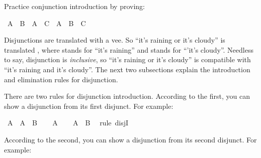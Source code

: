 \begin{isabellebody}
%
\begin{isamarkuptext}%
\begin{Exercise} Practice conjunction introduction by proving: \end{Exercise}%
\end{isamarkuptext}\isamarkuptrue%
\isamarkupfalse%
\ {\isachardoublequoteopen}{\isacharparenleft}A\ {\isasymlongrightarrow}\ B{\isacharparenright}\ {\isasymlongrightarrow}\ {\isacharparenleft}A\ {\isasymlongrightarrow}\ C{\isacharparenright}\ {\isasymlongrightarrow}\ A\ {\isasymlongrightarrow}\ B\ {\isasymand}\ C{\isachardoublequoteclose}%
\isadelimproof
\ %
\endisadelimproof
%
\isatagproof
{}\isamarkupfalse%
%
\endisatagproof
{\isafoldproof}%
%
\isadelimproof
%
\endisadelimproof
%
\isamarkuptrue%
%
\begin{isamarkuptext}%
Disjunctions are translated with a vee. So ``it's raining or it's cloudy'' is translated
, where  stands for ``it's raining'' and  stands for ``'it's cloudy''.
Needless to say, disjunction is \emph{inclusive}, so ``it's raining or it's cloudy'' is compatible with
``it's raining and it's cloudy''. The next two subsections explain the introduction and elimination
rules for disjunction.%
\end{isamarkuptext}\isamarkuptrue%
%
\isamarkuptrue%
%
\begin{isamarkuptext}%
There are two rules for disjunction introduction. According to the first, you can show a 
disjunction from its first disjunct. For example:%
\end{isamarkuptext}\isamarkuptrue%
\isamarkupfalse%
\ {\isachardoublequoteopen}A\ {\isasymlongrightarrow}\ A\ {\isasymor}\ B{\isachardoublequoteclose}\isanewline
%
\isadelimproof
%
\endisadelimproof
%
\isatagproof
{}\isamarkupfalse%
\isanewline
\ \ \isamarkupfalse%
\ {\isachardoublequoteopen}A{\isachardoublequoteclose}\isanewline
\ \ \isamarkupfalse%
\ {\isachardoublequoteopen}A\ {\isasymor}\ B{\isachardoublequoteclose}\ \isamarkupfalse%
\ {\isacharparenleft}rule\ disjI{}{\isacharparenright}\isanewline
{}\isamarkupfalse%
%
\endisatagproof
{\isafoldproof}%
%
\isadelimproof
%
\endisadelimproof
%
\begin{isamarkuptext}%
According to the second, you can show a disjunction from its second disjunct. For example:%
\end{isamarkuptext}\isamarkuptrue%

\end{isabellebody}
